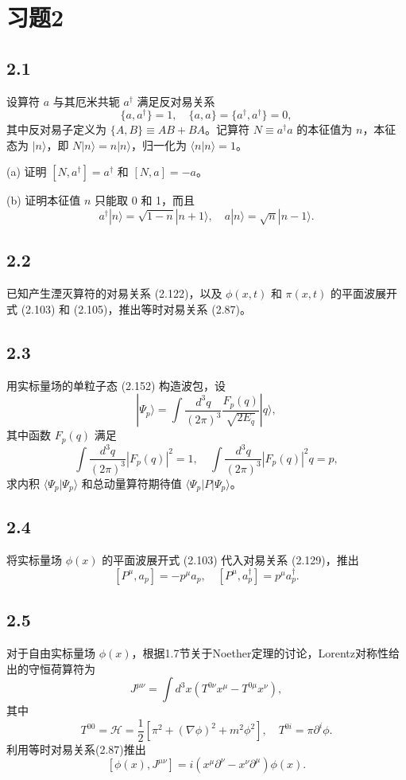 \section{习题2}

\newpage
\subsection{2.1}
设算符 $a$ 与其厄米共轭 $a^\dagger$ 满足反对易关系
$$\{a, a^\dagger\} = 1, \quad \{a, a\} = \{a^\dagger, a^\dagger\} = 0, \tag{2.221}$$
其中反对易子定义为 $\{A, B\} \equiv AB + BA$。记算符 $N \equiv a^\dagger a$ 的本征值为 $n$，本征态为 $|n\rangle$，即 $N |n\rangle = n |n\rangle$，归一化为 $\langle n|n\rangle = 1$。

(a) 证明 $[N, a^\dagger] = a^\dagger$ 和 $[N, a] = -a$。

(b) 证明本征值 $n$ 只能取 0 和 1，而且
$$a^\dagger |n\rangle = \sqrt{1 - n}|n + 1\rangle, \quad a |n\rangle = \sqrt{n}|n - 1\rangle. \tag{2.222}$$

\newpage
\subsection{2.2}
已知产生湮灭算符的对易关系 (2.122)，以及 $\phi(x,t)$ 和 $\pi(x,t)$ 的平面波展开式 (2.103) 和 (2.105)，推出等时对易关系 (2.87)。

\newpage
\subsection{2.3}
用实标量场的单粒子态 (2.152) 构造波包，设
$$|\Psi_p\rangle = \int \frac{d^3q}{(2\pi)^3} \frac{F_p(q)}{\sqrt{2E_q}} |q\rangle, \tag{2.223}$$
其中函数 $F_p(q)$ 满足
$$\int \frac{d^3q}{(2\pi)^3} |F_p(q)|^2 = 1, \quad \int \frac{d^3q}{(2\pi)^3} |F_p(q)|^2 q = p, \tag{2.224}$$
求内积 $\langle \Psi_p |\Psi_p\rangle$ 和总动量算符期待值 $\langle \Psi_p |P|\Psi_p\rangle$。

\newpage
\subsection{2.4}
将实标量场 $\phi(x)$ 的平面波展开式 (2.103) 代入对易关系 (2.129)，推出
$$[P^\mu, a_p] = -p^\mu a_p, \quad [P^\mu, a_p^\dagger] = p^\mu a_p^\dagger. \tag{2.225}$$

\newpage
\subsection{2.5}
对于自由实标量场 $\phi(x)$，根据1.7节关于Noether定理的讨论，Lorentz对称性给出的守恒荷算符为
$$J^{\mu\nu} = \int d^3x (T^{0\nu}x^\mu - T^{0\mu}x^\nu),$$
其中
$$T^{00} = \mathcal{H} = \frac{1}{2}[\pi^2 + (\nabla \phi)^2 + m^2 \phi^2], \quad T^{0i} = \pi \partial^i \phi.$$
利用等时对易关系(2.87)推出
$$[\phi(x), J^{\mu\nu}] = i(x^\mu \partial^\nu - x^\nu \partial^\mu)\phi(x). \tag{2.226}$$

